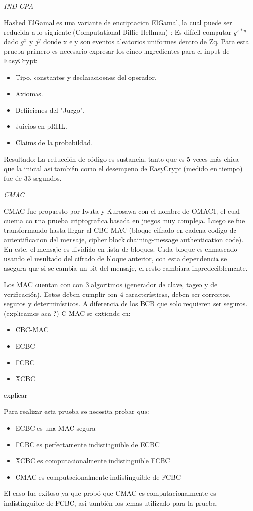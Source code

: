 \documentclass[runningheads,a4paper]{llncs}
\begin{document}
\centerline{\emph{IND-CPA}}

Hashed ElGamal es una variante de encriptacion ElGamal, la cual puede ser reducida a lo siguiente (Computational Diffie-Hellman) : Es difícil computar $g^{x*y}$ dado $g^x$ y $g^y$ donde x e y son eventos aleatorios uniformes dentro de Zq.
Para esta prueba primero es necesario expresar los cinco ingredientes para el input de EasyCrypt:
\begin{itemize}
	\item Tipo, constantes y declaracioenes del operador.
	\item Axiomas.
	\item Defiiciones del "Juego".
	\item Juicios en pRHL.
	\item Claims de la probabildad.
\end{itemize}

Resultado: La reducción de código es sustancial tanto que es 5 veces más chica que la inicial asi también como el desempeno de EasyCrypt (medido en tiempo) fue de 33 segundos.\cite{article5}


\centerline{\emph{CMAC}}
\cite{article7}
CMAC fue propuesto por Iwata y Kurosawa con el nombre de OMAC1, el cual cuenta co una prueba criptografica basada en juegos muy compleja. Luego se fue transformando hasta llegar al CBC-MAC (bloque cifrado en cadena-codigo de autentificacion del mensaje, cipher block chaining-message authentication code). En este, el mensaje es dividido en lista de bloques. Cada bloque es enmascado usando el resultado del cifrado de bloque anterior, con esta dependencia se asegura que si se cambia un bit  del mensaje, el resto cambiara inpredeciblemente.

Los MAC cuentan con con 3 algoritmos (generador de clave, tageo y de verificación). Estos deben cumplir con 4 características, deben ser correctos, seguros y determinísticos. A diferencia de los BCB que solo requieren ser seguros. (explicamos aca ?)
C-MAC se extiende en:
\begin{itemize}
	\item CBC-MAC
	\item ECBC
	\item FCBC
	\item XCBC
\end{itemize}
 explicar

Para realizar esta prueba se necesita probar que:
\begin{itemize}
	\item ECBC es una MAC segura
	\item FCBC es perfectamente indistinguible de ECBC
	\item XCBC es computacionalmente indistinguible FCBC
	\item CMAC es computacionalmente indistinguible de FCBC	
\end{itemize}
El caso fue exitoso ya que probó que CMAC es computacionalmente es indistinguible de FCBC, asi también los lemas utilizado para la prueba.
\end{document}
